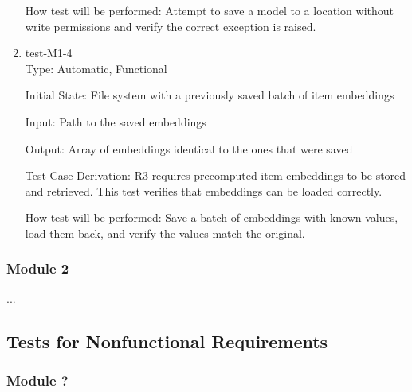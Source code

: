 \documentclass[12pt, titlepage]{article}
\begin{document}
\begin{enumerate}
  How test will be performed: Attempt to save a model to a location without write permissions and verify the correct exception is raised.
  
  \item{test-M1-4\\}
  Type: Automatic, Functional
            
  Initial State: File system with a previously saved batch of item embeddings
            
  Input: Path to the saved embeddings
            
  Output: Array of embeddings identical to the ones that were saved
  
  Test Case Derivation: R3 requires precomputed item embeddings to be stored and retrieved. This test verifies that embeddings can be loaded correctly.
  
  How test will be performed: Save a batch of embeddings with known values, load them back, and verify the values match the original.
\end{enumerate}

\subsubsection{Module 2}

...

\subsection{Tests for Nonfunctional Requirements}



\subsubsection{Module ?}
		
\end{document}
